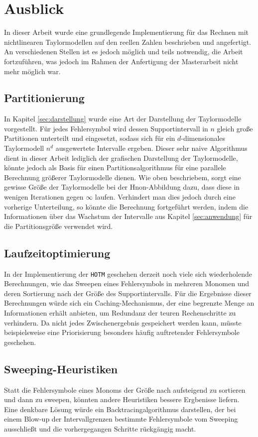 \section{Ausblick}
In dieser Arbeit wurde eine grundlegende Implementierung für das Rechnen mit nichtlinearen Taylormodellen auf den reellen Zahlen beschrieben und angefertigt. An verschiedenen Stellen ist es jedoch möglich und teils notwendig, die Arbeit fortzuführen, was jedoch im Rahmen der Anfertigung der Masterarbeit nicht mehr möglich war.

\subsection*{Partitionierung}
In Kapitel \ref{sec:darstellung} wurde eine Art der Darstellung der Taylormodelle vorgestellt. Für jedes Fehlersymbol wird dessen Supportintervall in $n$ gleich große Partitionen unterteilt und eingesetzt, sodass sich für ein $d$-dimensionales Taylormodell $n^d$ ausgewertete Intervalle ergeben. Dieser sehr naive Algorithmus dient in dieser Arbeit lediglich der grafischen Darstellung der Taylormodelle, könnte jedoch als Basis für einen Partitionsalgorithmus für eine parallele Berechnung größerer Taylormodelle dienen. Wie oben beschriebem, sorgt eine gewisse Größe der Taylormodelle bei der H\e non-Abbildung dazu, dass diese in wenigen Iterationen gegen $\infty$ laufen. Verhindert man dies jedoch durch eine vorherige Unterteilung, so könnte die Berechnung fortgeführt werden, indem die Informationen über das Wachstum der Intervalle aus Kapitel \ref{sec:anwendung} für die Partitionsgröße verwendet wird.


\subsection*{Laufzeitoptimierung} 
In der Implementierung der \verb+HOTM+ geschehen derzeit noch viele sich wiederholende Berechnungen, wie das Sweepen eines Fehlersymbols in mehreren Monomen und deren Sortierung nach der Größe des Supportintervalls. Für die Ergebnisse dieser Berechnungen würde sich ein Caching-Mechanismus, der eine begrenzte Menge an Informationen erhält anbieten, um Redundanz der teuren Rechenschritte zu verhindern. Da nicht jedes Zwischenergebnis gespeichert werden kann, müsste beispielsweise eine Priorisierung besonders häufig auftretender Fehlersymbole geschehen.


\subsection*{Sweeping-Heuristiken}
Statt die Fehlersymbole eines Monoms der Größe nach aufsteigend zu sortieren und dann zu sweepen, könnten andere Heuristiken bessere Ergbenisse liefern. Eine denkbare Lösung würde ein Backtracingalgorithmus darstellen, der bei einem Blow-up der Intervallgrenzen bestimmte Fehlersymbole vom Sweeping ausschließt und die vorhergegangen Schritte rückgängig macht.


